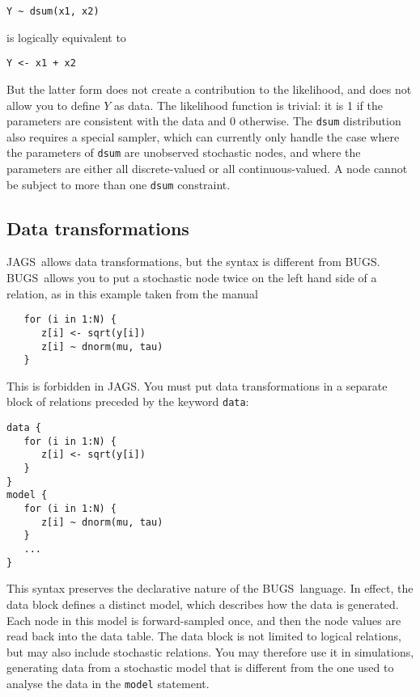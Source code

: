 \documentclass[11pt, a4paper, titlepage]{report}
\newcommand{\JAGS}{\textsf{JAGS}}
\newcommand{\BUGS}{\textsf{BUGS}}
\begin{document}
\begin{verbatim}
Y ~ dsum(x1, x2)
\end{verbatim}
is logically equivalent to
\begin{verbatim}
Y <- x1 + x2
\end{verbatim}
But the latter form does not create a contribution to the likelihood,
and does not allow you to define $Y$ as data.  The likelihood function
is trivial: it is 1 if the parameters are consistent with the data and
0 otherwise.  The \texttt{dsum} distribution also requires a special
sampler, which can currently only handle the case where the parameters
of \texttt{dsum} are unobserved stochastic nodes, and where the
parameters are either all discrete-valued or all continuous-valued. A node
cannot be subject to more than one \texttt{dsum} constraint.

\subsection{Data transformations}
\label{section:data:tranformations}

\JAGS\ allows data transformations, but the syntax is different from
\BUGS.  \BUGS\ allows you to put a stochastic node twice on the left
hand side of a relation, as in this example taken from the manual
\begin{verbatim}
   for (i in 1:N) {
      z[i] <- sqrt(y[i])
      z[i] ~ dnorm(mu, tau)
   }
\end{verbatim}
This is forbidden in \JAGS. You must put data transformations in a 
separate block of relations preceded by the keyword \texttt{data}:
\begin{verbatim}
data {
   for (i in 1:N) {
      z[i] <- sqrt(y[i])
   }
}
model {
   for (i in 1:N) {
      z[i] ~ dnorm(mu, tau)
   }
   ...
}
\end{verbatim}
This syntax preserves the declarative nature of the \BUGS\ language.
In effect, the data block defines a distinct model, which describes
how the data is generated. Each node in this model is forward-sampled
once, and then the node values are read back into the data table. The
data block is not limited to logical relations, but may also include
stochastic relations. You may therefore use it in simulations,
generating data from a stochastic model that is different from the one
used to analyse the data in the \texttt{model} statement.
\end{document}
